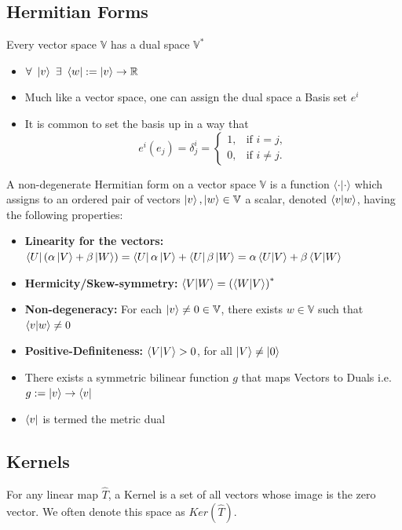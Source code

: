 \subsection{Hermitian Forms}
Every vector space $\mathbb{V}$ has a dual space $\mathbb{V}^{*}$
\begin{itemize}
\item $\forall \ \ket{v} \ \exists \ \bra{w} := \ket{v} \rightarrow \mathbb{R}$
\item Much like a vector space, one can assign the dual space a Basis set $e^{i}$
\item It is common to set the basis up in a way that $$e^{i}(e_{j}) = \delta^{i}_{j} = \begin{cases}            1, &         \text{if } i=j,\\
            0, &         \text{if } i\neq j.
    \end{cases}$$
\end{itemize}
A non-degenerate Hermitian form on a vector space $\mathbb{V}$ is a function
$\langle \cdot | \cdot \rangle$ which assigns to an ordered pair of vectors $\ket{v}, \ket{w} \in \mathbb{V}$ a scalar, denoted $\braket{v}{w}$,
having the following properties:
\begin{itemize}
    \item \textbf{Linearity for the vectors:} $\bra{U}(\alpha\ket{V}+\beta\ket{W}) = \bra{U}\alpha\ket{V} + \bra{U}\beta\ket{W} = \alpha\braket{U}{V} + \beta\braket{V}{W}$
    \item \textbf{Hermicity/Skew-symmetry:} $\braket{V}{W} = {(\braket{W}{V})}^{*}$
    \item \textbf{Non-degeneracy:} For each $\ket{v} \neq 0 \in \mathbb{V}$, there exists $w \in \mathbb{V}$ such that $\braket{v}{w} \neq 0$
    \item \textbf{Positive-Definiteness:} $\braket{V}{V} > 0$, for all $\ket{V} \neq \ket{0}$
\end{itemize}
\begin{itemize}
    \item There exists a symmetric bilinear function $g$ that maps Vectors to Duals i.e. $g : = \ket{v} \rightarrow \bra{v}$
    \item $\bra{v}$ is termed the metric dual
\end{itemize}

\subsection{Kernels}
For any linear map $\hat{T}$, a Kernel is a set of all vectors whose image is the zero vector. We often denote this space as $Ker(\hat{T})$.

